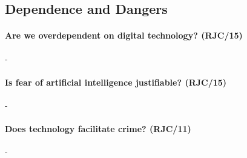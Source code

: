 \documentclass[../../main]{subfiles}
\begin{document}
\subsection{Dependence and Dangers}

\paragraph{Are we overdependent on digital technology? (RJC/15)}-

\paragraph{Is fear of artificial intelligence justifiable? (RJC/15)}-

\paragraph{Does technology facilitate crime? (RJC/11)}-
\end{document}
